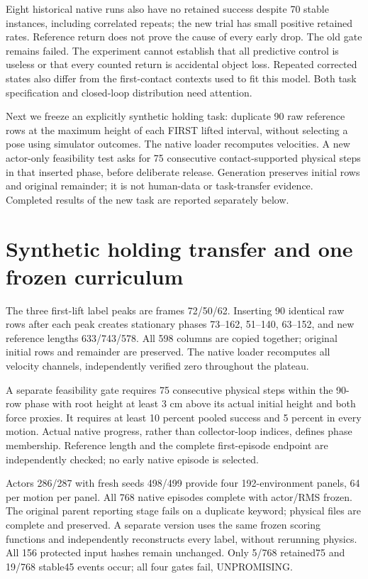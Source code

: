 \documentclass[10 pt]{article}
\begin{document}
Eight historical native runs also have no retained success despite 70 stable
instances, including correlated repeats; the new trial has small positive
retained rates. Reference return does not prove the cause of every early drop.
The old gate remains failed. The experiment cannot establish that all predictive
control is useless or that every counted return is accidental object loss.
Repeated corrected states also differ from the first-contact contexts used to
fit this model. Both task specification and closed-loop distribution need attention.

Next we freeze an explicitly synthetic holding task: duplicate 90 raw reference
rows at the maximum height of each FIRST lifted interval, without selecting a
pose using simulator outcomes. The native loader recomputes velocities. A new
actor-only feasibility test asks for 75 consecutive contact-supported physical
steps in that inserted phase, before deliberate release. Generation preserves
initial rows and original remainder; it is not human-data or task-transfer evidence.
Completed results of the new task are reported separately below.

\section{Synthetic holding transfer and one frozen curriculum}
The three first-lift label peaks are frames 72/50/62. Inserting 90 identical raw
rows after each peak creates stationary phases 73--162, 51--140, 63--152, and
new reference lengths 633/743/578. All 598 columns are copied together; original
initial rows and remainder are preserved. The native loader recomputes all
velocity channels, independently verified zero throughout the plateau.

A separate feasibility gate requires 75 consecutive physical steps within the
90-row phase with root height at least 3 cm above its actual initial height and
both force proxies. It requires at least 10 percent pooled success and 5 percent
in every motion. Actual native progress, rather than collector-loop indices,
defines phase membership. Reference length and the complete first-episode endpoint
are independently checked; no early native episode is selected.

Actors 286/287 with fresh seeds 498/499 provide four 192-environment panels, 64 per
motion per panel. All 768 native episodes complete with actor/RMS frozen.
The original parent reporting stage fails on a duplicate keyword; physical files
are complete and preserved. A separate version uses the same frozen scoring
functions and independently reconstructs every label, without rerunning physics.
All 156 protected input hashes remain unchanged. Only 5/768 retained75 and 19/768
stable45 events occur; all four gates fail, UNPROMISING.
\end{document}
